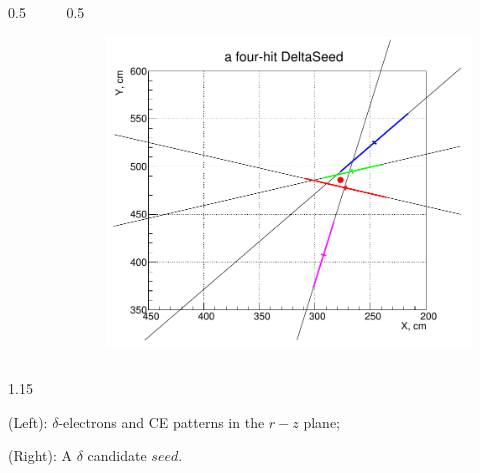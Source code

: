 \documentclass{beamer}
\begin{document}
\begin{frame}
\begin{columns}
\begin{column}{0.5\framewidth}
\begin{figure}[!h]
       \label{fig:momhits}
\end{figure}
        \end{column}
        \begin{column}{0.5\framewidth}
               \begin{figure}[!h]
        \centering
         \hspace*{-1em}
        \includegraphics[width =0.75\columnwidth]{figures/png/Screenshot_20240811_115854.png}
       \label{fig:momhits}
\end{figure}
        \end{column}
    \end{columns}
        \vspace{-3mm}
      \begin{columns}
        \begin{column}{1.15\framewidth}
    \setlength{\leftmargini}{1.2em}
    \begin{itemize}
    {\small   
    \item (Left): $\delta$-electrons and CE patterns in the $r-z$ plane;
    \item (Right): A $\delta$ candidate $seed$.}
    \end{itemize}
    \end{column}
    \end{columns}
\end{frame}
\end{document}
